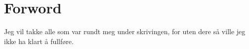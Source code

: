 \section*{Forword}

Jeg vil takke alle som var rundt meg under skrivingen, for uten dere så ville jeg ikke ha klart å fullføre. 
